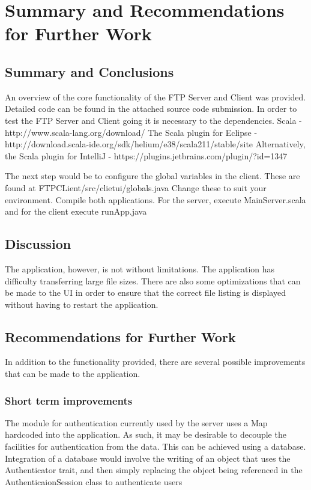 \chapter[Summary]{Summary and Recommendations for Further Work}

\section{Summary and Conclusions}

An overview of the core functionality of the FTP Server and Client was provided. Detailed code can be found in the attached source code submission.
In order to test the FTP Server and Client going it is necessary to the dependencies.
Scala - http://www.scala-lang.org/download/
The Scala plugin for Eclipse - http://download.scala-ide.org/sdk/helium/e38/scala211/stable/site
Alternatively, the Scala plugin for IntelliJ - https://plugins.jetbrains.com/plugin/?id=1347\par

The next step would be to configure the global variables in the client. These are found at FTPCLient/src/clietui/globals.java
Change these to suit your environment. Compile both applications. For the server, execute MainServer.scala and for the client execute runApp.java

\section{Discussion}

The application, however, is not without limitations. The application has difficulty transferring large file sizes. There are also some optimizations that
can be made to the UI in order to ensure that the correct file listing is displayed without having to restart the application.

\section{Recommendations for Further Work}

In addition to the functionality provided, there are several possible improvements that can be made to the application.

\subsection{Short term improvements}
The module for authentication currently used by the server uses a Map hardcoded into the application. As such, it may be desirable to decouple the facilities for authentication from the data. This can be achieved using a database. Integration of a database would involve the writing of an object  that uses the Authenticator trait, and then simply replacing the object being referenced in the AuthenticaionSession class to authenticate users

